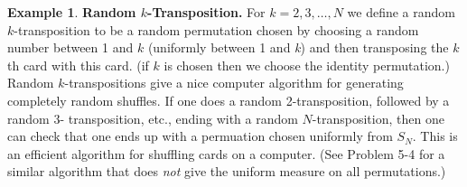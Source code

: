 \documentclass{stml-l}
\theoremstyle{definition}
\newtheorem{example}{Example}
\numberwithin{equation}{chapter}
\numberwithin{figure}{chapter}
\numberwithin{figure}{section}
\begin{document}
\begin{example}\label{ch05:exa4} \textbf{Random $k$-Transposition.} For $k=2,3,\ldots,N$ we define a random $k$-transposition to be a random permutation chosen by choosing a random number between 1 and $k$ (uniformly between 1 and \emph{k}) and then transposing the $k$th card with this card. (if $k$ is chosen then we choose the identity permutation.) Random $k$-transpositions give a nice computer algorithm for generating completely random shuffles. If one does a random 2-transposition, followed by a random 3- transposition, etc., ending with a random $N$-transposition, then one can check that one ends up with a permuation chosen uniformly from $S_{N}$. This is an efficient algorithm for shuffling cards on a computer. (See Problem 5-4 for a similar algorithm that does \emph{not} give the uniform measure on all permutations.)
\end{example}
\end{document}
